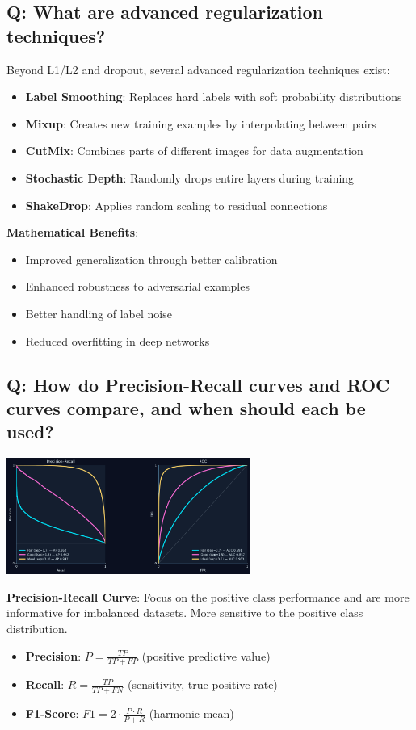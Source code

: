 \subsection*{\textcolor{primaryteal}{Q: What are advanced regularization techniques?}}
Beyond L1/L2 and dropout, several advanced regularization techniques exist:

\begin{itemize}
	\item \textbf{Label Smoothing}: Replaces hard labels with soft probability distributions
	\item \textbf{Mixup}: Creates new training examples by interpolating between pairs
	\item \textbf{CutMix}: Combines parts of different images for data augmentation
	\item \textbf{Stochastic Depth}: Randomly drops entire layers during training
	\item \textbf{ShakeDrop}: Applies random scaling to residual connections
\end{itemize}

\textbf{Mathematical Benefits}:
\begin{itemize}
	\item Improved generalization through better calibration
	\item Enhanced robustness to adversarial examples
	\item Better handling of label noise
	\item Reduced overfitting in deep networks
\end{itemize}

\subsection*{\textcolor{primaryteal}{Q: How do Precision-Recall curves and ROC curves compare, and when should each be used?}}
\begin{center}
	\includegraphics[width=0.6\textwidth]{images/pr_roc.png}
\end{center}

\textbf{Precision-Recall Curve}:
Focus on the positive class performance and are more informative for imbalanced datasets. More sensitive to the positive class distribution.
\begin{itemize}
	\item \textbf{Precision}: $P = \frac{TP}{TP + FP}$ (positive predictive value)
	\item \textbf{Recall}: $R = \frac{TP}{TP + FN}$ (sensitivity, true positive rate)
	\item \textbf{F1-Score}: $F1 = 2 \cdot \frac{P \cdot R}{P + R}$ (harmonic mean)
\end{itemize}

